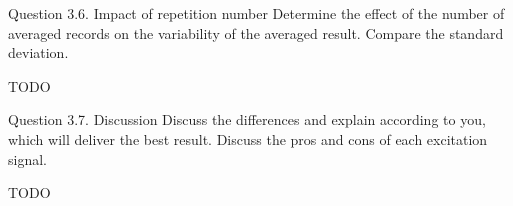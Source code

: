 \begin{Task}{Question 3.6. Impact of repetition number}
    Determine the effect of the number of averaged records on the variability of the averaged result. Compare the standard deviation.
\end{Task}

\huge{TODO}
\normalsize

\begin{Task}{Question 3.7. Discussion}
    Discuss the differences and explain according to you, which will deliver the best result. Discuss the pros and cons of each excitation signal.
\end{Task}

\huge{TODO}
\normalsize
